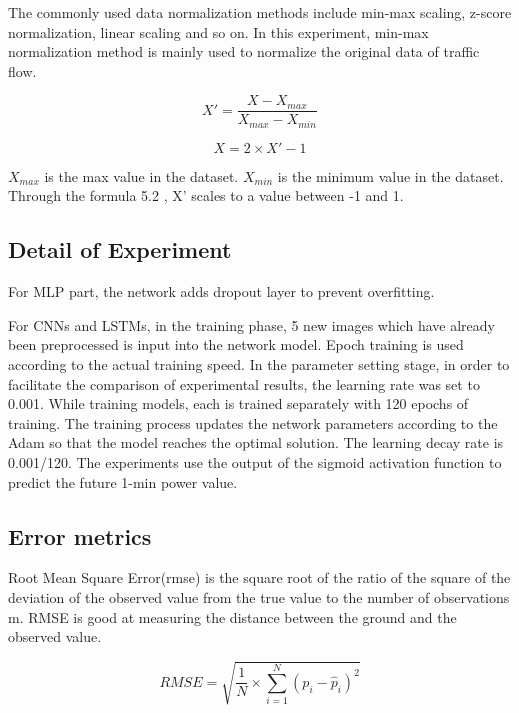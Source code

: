 The commonly used data normalization methods include min-max scaling, z-score normalization, linear scaling and so on. In this experiment, min-max normalization method is mainly used to normalize the original data of traffic flow.

\begin{equation}
	X'=\frac{X-X_{max}}{X_{max}-X_{min}}
\end{equation}

\begin{equation}
	X=2\times X' - 1
\end{equation}


$X_{max}$ is the max value in the dataset. $X_{min}$ is the minimum value in the dataset. Through the formula 5.2 , X' scales to a value between -1 and 1.



\subsection{Detail of Experiment}
For MLP part, the network adds dropout layer to prevent overfitting. 

For CNNs and LSTMs, in the training phase, 5 new images which have already been preprocessed is input into the network model. Epoch training is used according to the actual training speed. 
In the parameter setting stage, in order to facilitate the comparison of experimental results, the learning rate was set to 0.001. While training models, each is trained separately with 120 epochs of training. The training process updates the network parameters according to the Adam so that the model reaches the optimal solution. The learning decay rate is 0.001/120.
The experiments use the output of the sigmoid activation function to predict the future 1-min power value.




\subsection{Error metrics}
Root Mean Square Error(rmse) is the square root of the ratio of the square of the deviation of the observed value from the true value to the number of observations m.
RMSE is good at measuring the distance between the ground and the observed value.\cite{willmott2005advantages}

\begin{equation}
	RMSE=\sqrt{\frac{1}{N}\times \sum_{i=1}^{N}(p_{i}-\hat{p}_i)^2}
\end{equation}


